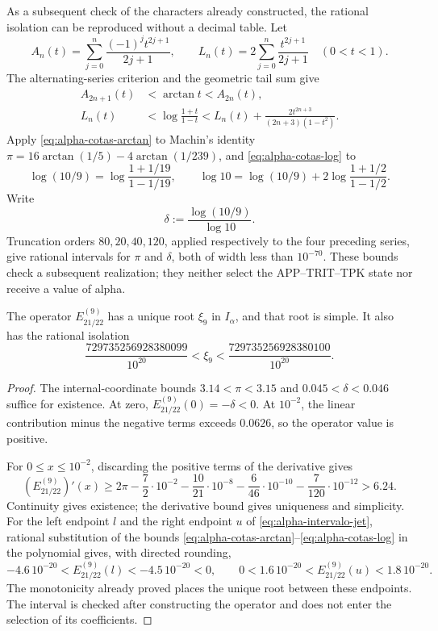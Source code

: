 As a subsequent check of the characters already constructed, the
rational isolation can be reproduced without a decimal table. Let
\[
 A_n(t)=\sum_{j=0}^{n}\frac{(-1)^jt^{2j+1}}{2j+1},\qquad
 L_n(t)=2\sum_{j=0}^{n}\frac{t^{2j+1}}{2j+1}\quad(0<t<1).
\]
The alternating-series criterion and the geometric tail sum give
\begin{align}
 A_{2n+1}(t)&<\arctan t<A_{2n}(t),
 \label{eq:alpha-cotas-arctan}\\
 L_n(t)&<\log\frac{1+t}{1-t}
 <L_n(t)+\frac{2t^{2n+3}}{(2n+3)(1-t^2)}.
 \label{eq:alpha-cotas-log}
\end{align}
Apply \eqref{eq:alpha-cotas-arctan} to Machin's identity
\(\pi=16\arctan(1/5)-4\arctan(1/239)\), and
\eqref{eq:alpha-cotas-log} to
\[
 \log(10/9)=\log\frac{1+1/19}{1-1/19},\qquad
 \log 10=\log(10/9)+2\log\frac{1+1/2}{1-1/2}.
\]
Write
\[
 \delta:=\frac{\log(10/9)}{\log 10}.
\]
Truncation orders \(80,20,40,120\), applied respectively to the four
preceding series, give rational intervals for \(\pi\) and \(\delta\),
both of width less than \(10^{-70}\). These bounds check a subsequent
realization; they neither select the APP--TRIT--TPK state nor receive
a value of alpha.

\begin{proposition}
\label{prop:alpha-raiz-jet}
The operator \(E_{21/22}^{(9)}\) has a unique root
\(\xi_9\) in \(I_\alpha\), and that root is simple. It also has the rational isolation
\begin{equation}
 \frac{729735256928380099}{10^{20}}
 <\xi_9<\frac{729735256928380100}{10^{20}}.
 \label{eq:alpha-intervalo-jet}
\end{equation}
\end{proposition}

\begin{proof}
The internal-coordinate bounds
\(3.14<\pi<3.15\) and
\(0.045<\delta<0.046\) suffice for existence. At zero,
\(E_{21/22}^{(9)}(0)=-\delta<0\). At \(10^{-2}\), the linear
contribution minus the negative terms exceeds \(0.0626\), so the
operator value is positive.

For \(0\leq x\leq10^{-2}\), discarding the positive terms of
the derivative gives
\[
 (E_{21/22}^{(9)})'(x)
 \geq2\pi-\frac72\cdot10^{-2}
 -\frac{10}{21}\cdot10^{-8}-\frac6{46}\cdot10^{-10}
 -\frac7{120}\cdot10^{-12}>6.24.
\]
Continuity gives existence; the derivative bound gives uniqueness and
simplicity. For the left endpoint \(l\) and the right endpoint \(u\)
of \eqref{eq:alpha-intervalo-jet}, rational substitution of the bounds
\eqref{eq:alpha-cotas-arctan}--\eqref{eq:alpha-cotas-log} in the polynomial
gives, with directed rounding,
\[
 -4.6\,10^{-20}<E_{21/22}^{(9)}(l)<-4.5\,10^{-20}<0,
 \qquad
 0<1.6\,10^{-20}<E_{21/22}^{(9)}(u)<1.8\,10^{-20}.
\]
The monotonicity already proved places the unique root between these
endpoints. The interval is checked after constructing the operator and
does not enter the selection of its coefficients.
\end{proof}

